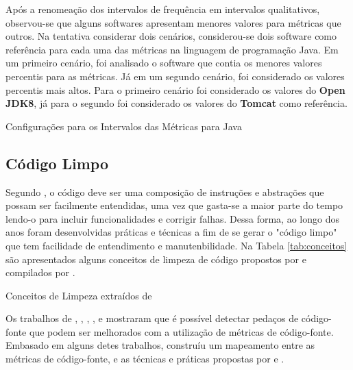 \FloatBarrier

Após a renomeação dos intervalos de frequência em intervalos qualitativos, observou-se que alguns softwares apresentam menores valores para métricas que outros. Na tentativa considerar dois cenários, considerou-se dois software como referência para cada uma das métricas na linguagem de programação Java. Em um primeiro cenário, foi analisado o software que contia os menores valores percentis para as métricas. Já em um segundo cenário, foi considerado os valores percentis mais altos. Para o primeiro cenário foi considerado os valores do \textbf{Open JDK8}, já para o segundo foi considerado os valores do \textbf{Tomcat} como referência.


	
	\begin{table}[!ht]
	\begin{center}
		
	\caption{Configurações para os Intervalos das Métricas para Java}
	\label{tab:good-metrics}
	\end{center}
	\end{table}
	\FloatBarrier

\subsection{Código Limpo} 
\label{sec:clean-code}

Segundo , o código deve ser uma composição de instruções e abstrações que possam ser facilmente entendidas, uma vez que gasta-se a maior parte do tempo lendo-o para incluir funcionalidades e corrigir falhas. Dessa forma, ao longo dos anos foram desenvolvidas práticas e técnicas a fim de se gerar o "código limpo" que tem facilidade de entendimento e manutenbilidade. Na Tabela \ref{tab:conceitos} são apresentados alguns conceitos de limpeza de código propostos por  e  compilados por .


\begin{table}[!ht]
\centering

\caption{Conceitos de Limpeza extraídos de }
\label{tab:conceitos}
\end{table}
\FloatBarrier

Os trabalhos de , , , ,  e  mostraram que é possível detectar pedaços de código-fonte que podem ser melhorados com a utilização de métricas de código-fonte. Embasado em alguns detes trabalhos,  construíu um mapeamento entre as métricas de código-fonte, e as técnicas e práticas propostas por  e . 


